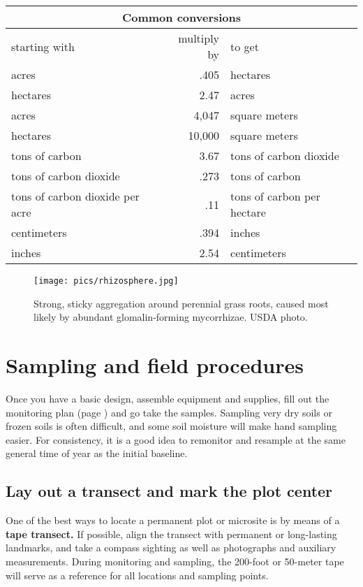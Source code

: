 \documentclass[11pt,letterpaper,oneside,onecolumn]{memoir}
\begin{document}
\begin{center}
\begin{tabular}{|l|r|l|}
\multicolumn{3}{c}{\textbf{Common conversions}}\\ \hline
starting with&multiply by&to get\\ \hline
acres&.405&hectares\\ \hline
hectares&2.47&acres\\ \hline
acres&4,047&square meters\\ \hline
hectares&10,000&square meters\\ \hline
tons of carbon&3.67&tons of carbon dioxide\\ \hline
tons of carbon dioxide&.273&tons of carbon\\ \hline
tons of carbon dioxide per acre&.11&tons of carbon per hectare\\ \hline
centimeters&.394&inches\\ \hline
inches&2.54&centimeters\\ \hline
\end{tabular}
\end{center}


\begin{figure}
\centering
\texttt{[image: pics/rhizosphere.jpg]}
\caption{Strong, sticky aggregation around perennial grass roots, caused most likely by abundant glomalin-forming mycorrhizae. USDA photo.}
\end{figure}


\chapter{Sampling and field procedures}

Once you have a basic design, assemble equipment and supplies, fill out the monitoring plan (page \pageref{monitoringplan}) and go take the samples. Sampling very dry soils or frozen soils is often difficult, and some soil moisture will make hand sampling easier. For consistency, it is a good idea to remonitor and resample at the same general time of year as the initial baseline.

\section{Lay out a transect and mark the plot center}

One of the best ways to locate a permanent plot or microsite is by means of a \textbf{tape transect.} If possible, align the transect with permanent or long-lasting landmarks, and take a compass sighting as well as photographs and auxiliary measurements. During monitoring and sampling, the 200-foot or 50-meter tape will serve as a reference for all locations and sampling points.
\end{document}

